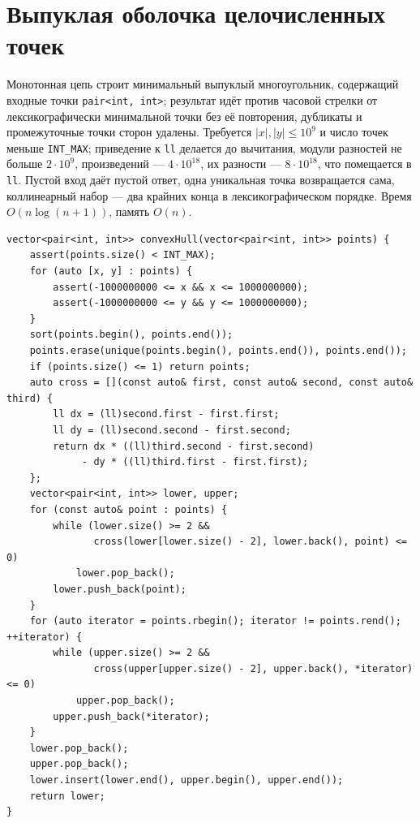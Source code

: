 \section{Выпуклая оболочка целочисленных точек}
Монотонная цепь строит минимальный выпуклый многоугольник, содержащий входные точки \texttt{pair<int, int>}; результат идёт против часовой стрелки от лексикографически минимальной точки без её повторения, дубликаты и промежуточные точки сторон удалены.
Требуется $|x|,|y|\le10^9$ и число точек меньше \texttt{INT\_MAX}; приведение к \texttt{ll} делается до вычитания, модули разностей не больше $2\cdot10^9$, произведений --- $4\cdot10^{18}$, их разности --- $8\cdot10^{18}$, что помещается в \texttt{ll}.
Пустой вход даёт пустой ответ, одна уникальная точка возвращается сама, коллинеарный набор --- два крайних конца в лексикографическом порядке.
Время $O(n\log(n+1))$, память $O(n)$.
\begin{lstlisting}[name=geometry_hull]
vector<pair<int, int>> convexHull(vector<pair<int, int>> points) {
    assert(points.size() < INT_MAX);
    for (auto [x, y] : points) {
        assert(-1000000000 <= x && x <= 1000000000);
        assert(-1000000000 <= y && y <= 1000000000);
    }
    sort(points.begin(), points.end());
    points.erase(unique(points.begin(), points.end()), points.end());
    if (points.size() <= 1) return points;
    auto cross = [](const auto& first, const auto& second, const auto& third) {
        ll dx = (ll)second.first - first.first;
        ll dy = (ll)second.second - first.second;
        return dx * ((ll)third.second - first.second)
             - dy * ((ll)third.first - first.first);
    };
    vector<pair<int, int>> lower, upper;
    for (const auto& point : points) {
        while (lower.size() >= 2 &&
               cross(lower[lower.size() - 2], lower.back(), point) <= 0)
            lower.pop_back();
        lower.push_back(point);
    }
    for (auto iterator = points.rbegin(); iterator != points.rend(); ++iterator) {
        while (upper.size() >= 2 &&
               cross(upper[upper.size() - 2], upper.back(), *iterator) <= 0)
            upper.pop_back();
        upper.push_back(*iterator);
    }
    lower.pop_back();
    upper.pop_back();
    lower.insert(lower.end(), upper.begin(), upper.end());
    return lower;
}
\end{lstlisting}
